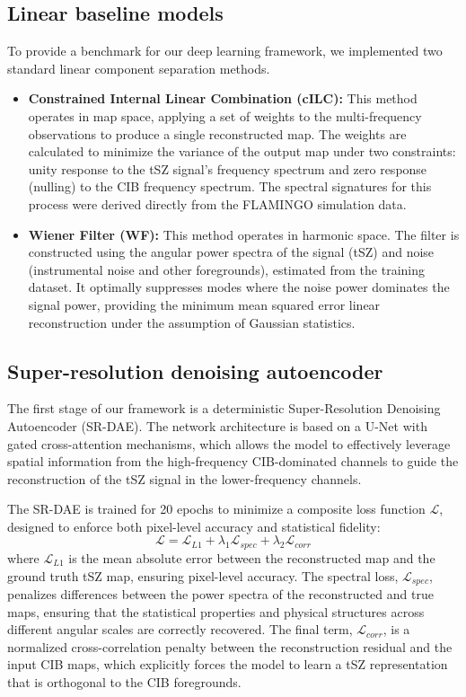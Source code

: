 \documentclass[]{article}
\begin{document}
\subsection{Linear baseline models}
To provide a benchmark for our deep learning framework, we implemented two standard linear component separation methods.
\begin{itemize}
    \item \textbf{Constrained Internal Linear Combination (cILC):} This method operates in map space, applying a set of weights to the multi-frequency observations to produce a single reconstructed map. The weights are calculated to minimize the variance of the output map under two constraints: unity response to the tSZ signal's frequency spectrum and zero response (nulling) to the CIB frequency spectrum. The spectral signatures for this process were derived directly from the FLAMINGO simulation data.
    \item \textbf{Wiener Filter (WF):} This method operates in harmonic space. The filter is constructed using the angular power spectra of the signal (tSZ) and noise (instrumental noise and other foregrounds), estimated from the training dataset. It optimally suppresses modes where the noise power dominates the signal power, providing the minimum mean squared error linear reconstruction under the assumption of Gaussian statistics.
\end{itemize}

\subsection{Super-resolution denoising autoencoder}
The first stage of our framework is a deterministic Super-Resolution Denoising Autoencoder (SR-DAE). The network architecture is based on a U-Net with gated cross-attention mechanisms, which allows the model to effectively leverage spatial information from the high-frequency CIB-dominated channels to guide the reconstruction of the tSZ signal in the lower-frequency channels.

The SR-DAE is trained for 20 epochs to minimize a composite loss function $\mathcal{L}$, designed to enforce both pixel-level accuracy and statistical fidelity:
\begin{equation}
    \mathcal{L} = \mathcal{L}_{L1} + \lambda_1 \mathcal{L}_{spec} + \lambda_2 \mathcal{L}_{corr}
\end{equation}
where $\mathcal{L}_{L1}$ is the mean absolute error between the reconstructed map and the ground truth tSZ map, ensuring pixel-level accuracy. The spectral loss, $\mathcal{L}_{spec}$, penalizes differences between the power spectra of the reconstructed and true maps, ensuring that the statistical properties and physical structures across different angular scales are correctly recovered. The final term, $\mathcal{L}_{corr}$, is a normalized cross-correlation penalty between the reconstruction residual and the input CIB maps, which explicitly forces the model to learn a tSZ representation that is orthogonal to the CIB foregrounds.
\end{document}
